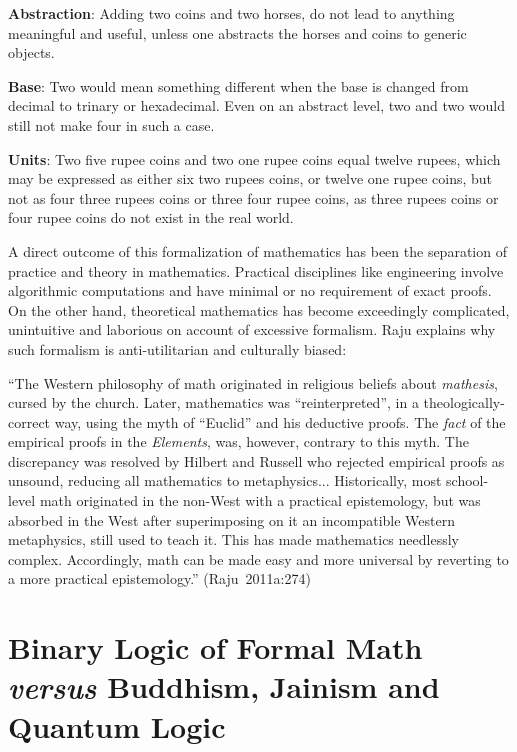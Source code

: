 {{\bf Abstraction}}: Adding two coins and two horses, do not lead to anything meaningful and useful, unless one abstracts the horses and coins to generic objects.

{{\bf Base}}: Two would mean something different when the base is changed from decimal to trinary or hexadecimal. Even on an abstract level, two and two would still not make four in such a case.

{{\bf Units}}: Two five rupee coins and two one rupee coins equal twelve rupees, which may be expressed as either six two rupees coins, or twelve one rupee coins, but not as four three rupees coins or three four rupee coins, as three rupees coins or four rupee coins do not exist in the real world.

A direct outcome of this formalization of mathematics has been the separation of practice and theory in mathematics. Practical disciplines like engineering involve algorithmic computations and have minimal or no requirement of exact proofs. On the other hand, theoretical mathematics has become exceedingly complicated, unintuitive and laborious on account of excessive formalism. Raju explains why such formalism is anti-utilitarian and culturally biased: 
\begin{myquote}
``The Western philosophy of math originated in religious beliefs about {\sl mathesis}, cursed by the church. Later, mathematics was ``reinterpreted'', in a theologically-correct way, using the myth of ``Euclid'' and his deductive proofs. The {\sl fact} of the empirical proofs in the {\sl Elements}, was, however, contrary to this myth. The discrepancy was resolved by Hilbert and Russell who rejected empirical proofs as unsound, reducing all mathematics to metaphysics... Historically, most school-level math originated in the non-West with a practical epistemology, but was absorbed in the West after superimposing on it an incompatible Western metaphysics, still used to teach it. This has made mathematics needlessly complex. Accordingly, math can be made easy and more universal by reverting to a more practical epistemology.''
\hfill \hbox{(Raju 2011a:274)}
\end{myquote}

\section*{Binary Logic of Formal Math {\sl\bfseries versus} Buddhism, Jainism and Quantum Logic}

